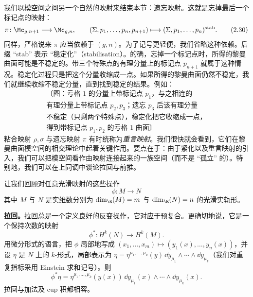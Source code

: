 我们以模空间之间另一个自然的映射来结束本节：遗忘映射。这就是忘掉最后一个标记点的映射：
\begin{equation}
  \pi\colon\Mc_{g,n+1}\longrightarrow\Mc_{g,n},
  \qquad
  (\Sigma,p_1,\dots,p_n,p_{n+1})\longmapsto(\Sigma,p_1,\dots,p_n)^{\mathrm{stab}}.
  \tag{2.30}
\end{equation}
同样，严格说来 $\pi$ 应当依赖于 $(g,n)$。为了记号更轻便，我们省略这种依赖。后缀 “stab” 表示 “稳定化”（stabilisation）。的确，忘掉一个标记点时，所得的黎曼曲面可能是不稳定的。带三个特殊点的有理分量上的标记点 $p_{n+1}$ 就属于这种情况。稳定化过程只是把这个分量收缩成一点。如果所得的黎曼曲面仍然不稳定，我们就继续收缩不稳定分量，直到找到稳定的结果。例如：
\begin{equation}
  \begin{array}{c}
    \text{〔图：亏格 }1\text{ 的分量上带标记点 }p_1\text{，与之相连的}\\
    \text{有理分量上带标记点 }p_2,p_3\text{；遗忘 }p_3\text{ 后该有理分量}\\
    \text{不稳定（只剩两个特殊点），稳定化把它收缩成一点，}\\
    \text{得到带标记点 }p_1,p_2\text{ 的亏格 }1\text{ 曲面〕}
  \end{array}
  \tag{2.31}
\end{equation}
粘合映射 $\rho,\sigma$ 与遗忘映射 $\pi$ 有时统称为\emph{重言映射}。我们很快就会看到，它们在黎曼曲面模空间的相交理论中起着关键作用。要点在于：由于紧化以及重言映射的引入，我们可以把模空间看作由映射连接起来的一族空间（而不是 “孤立” 的）。特别地，我们可以在上同调中谈论拉回与前推。


让我们回顾对任意光滑映射的这些操作
\begin{equation}
  \phi\colon M\longrightarrow N
  \tag{2.32}
\end{equation}
其中 $M$ 与 $N$ 是实维数分别为 $\dim_{\R}(M)=m$ 与 $\dim_{\R}(N)=n$ 的光滑实轨形。

\textbf{拉回。}拉回总是一个定义良好的反变操作，它对应于预复合。更确切地说，它是一个保持次数的映射
\begin{equation}
  \phi^*\colon H^k(N)\longrightarrow H^k(M).
  \tag{2.33}
\end{equation}
用微分形式的语言，把 $\phi$ 局部地写成 $(x_1,\dots,x_m)\mapsto(y_1(x),\dots,y_n(x))$，并设 $\eta$ 是 $N$ 上的 $k$-形式，局部表示为 $\eta=\eta^{\mu_1,\dots,\mu_k}(y)\,\dd y_{\mu_1}\wedge\cdots\wedge\dd y_{\mu_k}$（我们对重复指标采用 Einstein 求和记号）。则
\begin{equation}
  \phi^*\eta=\eta^{\mu_1,\dots,\mu_k}(y(x))\,\dd y_{\mu_1}(x)\wedge\cdots\wedge\dd y_{\mu_k}(x).
  \tag{2.34}
\end{equation}
拉回与加法及 cup 积都相容。

